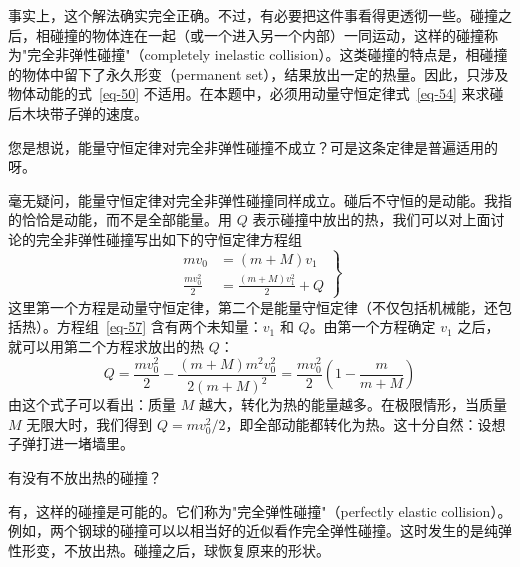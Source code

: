 \begin{dialogue}
\tchr 事实上，这个解法确实完全正确。不过，有必要把这件事看得更透彻一些。碰撞之后，相碰撞的物体连在一起（或一个进入另一个内部）一同运动，这样的碰撞称为"完全非弹性碰撞"（completely inelastic collision）。这类碰撞的特点是，相碰撞的物体中留下了永久形变（permanent set），结果放出一定的热量。因此，只涉及物体动能的式~\eqref{eq-50} 不适用。在本题中，必须用动量守恒定律式~\eqref{eq-54} 来求碰后木块带子弹的速度。

\stda 您是想说，能量守恒定律对完全非弹性碰撞不成立？可是这条定律是普遍适用的呀。

\tchr 毫无疑问，能量守恒定律对完全非弹性碰撞同样成立。碰后不守恒的是动能。我指的恰恰是动能，而不是全部能量。用 $Q$ 表示碰撞中放出的热，我们可以对上面讨论的完全非弹性碰撞写出如下的守恒定律方程组
\begin{equation}%
\left.
\begin{aligned}
mv_{0}  & = (m + M) v_{1} \\
\frac{mv_{0}^{2}}{2} & = \frac{(m+M) v_{1}^{2}}{2} + Q
\label{eq-57}
\end{aligned}
\right\}
\end{equation}
这里第一个方程是动量守恒定律，第二个是能量守恒定律（不仅包括机械能，还包括热）。方程组~\eqref{eq-57} 含有两个未知量：$v_{1}$ 和 $Q$。由第一个方程确定 $v_{1}$ 之后，就可以用第二个方程求放出的热 $Q$：
\begin{equation}%
Q = \frac{mv_{0}^{2}}{2} - \frac{(m+M)m^{2}v_{0}^{2}}{2(m+M)^{2}} =  \frac{mv_{0}^{2}}{2} \left( 1 - \frac{m}{m+M}\right)
\label{eq-58}
\end{equation}
由这个式子可以看出：质量 $M$ 越大，转化为热的能量越多。在极限情形，当质量 $M$ 无限大时，我们得到 $Q=m v_{0}^{2}/2$，即全部动能都转化为热。这十分自然：设想子弹打进一堵墙里。

\stda 有没有不放出热的碰撞？

\tchr 有，这样的碰撞是可能的。它们称为"完全弹性碰撞"（perfectly elastic collision）。例如，两个钢球的碰撞可以以相当好的近似看作完全弹性碰撞。这时发生的是纯弹性形变，不放出热。碰撞之后，球恢复原来的形状。


\end{dialogue}

